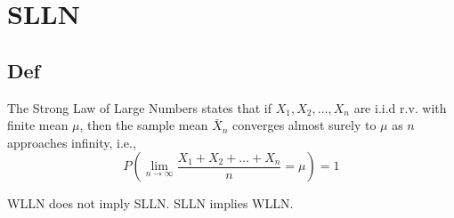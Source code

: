 \section{SLLN}
    \subsection*{Def}
    The Strong Law of Large Numbers states that if $X_1, X_2, \ldots, X_n$ are i.i.d r.v. with finite mean $\mu$, then the sample mean $\bar{X}_n$ converges almost surely to $\mu$ as $n$ approaches infinity, i.e.,
    \[
    P\left(\lim_{{n \to \infty}}\frac{X_1 + X_2 + \ldots + X_n}{n} = \mu \right) = 1
    \]

    WLLN does not imply SLLN. SLLN implies WLLN.
   
        
